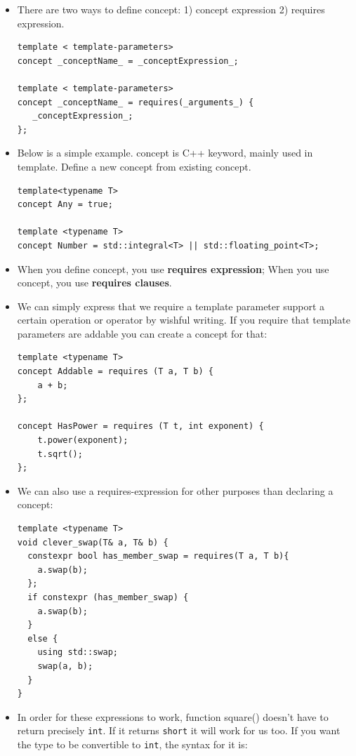 \documentclass[a4paper,11pt,twoside]{book}
\begin{document}
\begin{itemize}
    \item There are two ways to define concept: 1) concept expression 2) requires expression.
\begin{lstlisting}
template < template-parameters>
concept _conceptName_ = _conceptExpression_;

template < template-parameters>
concept _conceptName_ = requires(_arguments_) {
   _conceptExpression_;
};
\end{lstlisting}

	\item Below is a simple example. concept is C++ keyword, mainly used in template. Define a new concept from existing concept.
\begin{lstlisting}
template<typename T> 
concept Any = true;

template <typename T>
concept Number = std::integral<T> || std::floating_point<T>;	
\end{lstlisting}

    \item When you define concept, you use \textbf{requires expression}; When you use concept, you use \textbf{requires clauses}.
    
    \item We can simply express that we require a template parameter support a certain operation or operator by wishful writing. If you require that template parameters are addable you can create a concept for that:

\begin{lstlisting}
template <typename T>
concept Addable = requires (T a, T b) {
	a + b; 
};

concept HasPower = requires (T t, int exponent) {
	t.power(exponent);
	t.sqrt();
};
\end{lstlisting}

    \item We can also use a requires-expression for other purposes than declaring a concept:

\begin{lstlisting}
template <typename T>
void clever_swap(T& a, T& b) {
  constexpr bool has_member_swap = requires(T a, T b){ 
    a.swap(b); 
  };
  if constexpr (has_member_swap) {
    a.swap(b);
  }
  else {
    using std::swap;
    swap(a, b);
  }
}
\end{lstlisting}

    \item In order for these expressions to work, function square() doesn’t have to return precisely \texttt{int}. If it returns \texttt{short} it will work for us too. If you want the type to be convertible to \texttt{int}, the syntax for it is:


\end{itemize}
\end{document}

